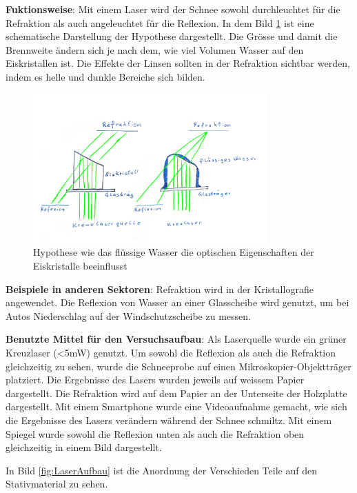 

\textbf{Fuktionsweise}: Mit einem Laser wird der Schnee sowohl durchleuchtet für die Refraktion als auch angeleuchtet für die Reflexion. In dem Bild \ref{fig:LaserHypothese} ist eine schematische Darstellung der Hypothese dargestellt. Die Grösse und damit die Brennweite ändern sich je nach dem, wie viel Volumen Wasser auf den Eiskristallen ist. Die Effekte der Linsen sollten in der Refraktion sichtbar werden, indem es helle und dunkle Bereiche sich bilden.


\begin{figure}
    \centering
    \includegraphics[width=0.8\textwidth]{Bilder/Reflaktion.jpeg}
    \caption{Hypothese wie das flüssige Wasser die optischen Eigenschaften der Eiskristalle beeinflusst}
    \label{fig:LaserHypothese}
\end{figure}

\textbf{Beispiele in anderen Sektoren}:
Refraktion wird in der Kristallografie angewendet. Die Reflexion von Wasser an einer Glasscheibe wird genutzt, um bei Autos Niederschlag auf der Windschutzscheibe zu messen.


\textbf{Benutzte Mittel für den Versuchsaufbau}:
Als Laserquelle wurde ein grüner Kreuzlaser (<5mW) genutzt. Um sowohl die Reflexion als auch die Refraktion gleichzeitig zu sehen, wurde die Schneeprobe auf einen Mikroskopier-Objektträger platziert. Die Ergebnisse des Lasers wurden jeweils auf weissem Papier dargestellt. Die Refraktion wird auf dem Papier an der Unterseite der Holzplatte dargestellt. Mit einem Smartphone wurde eine Videoaufnahme gemacht, wie sich die Ergebnisse des Lasers verändern während der Schnee schmiltz. Mit einem Spiegel wurde sowohl die Reflexion unten als auch die Refraktion oben gleichzeitig in einem Bild dargestellt.



In Bild \ref{fig:LaserAufbau} ist die Anordnung der Verschieden Teile auf den Stativmaterial zu sehen.


